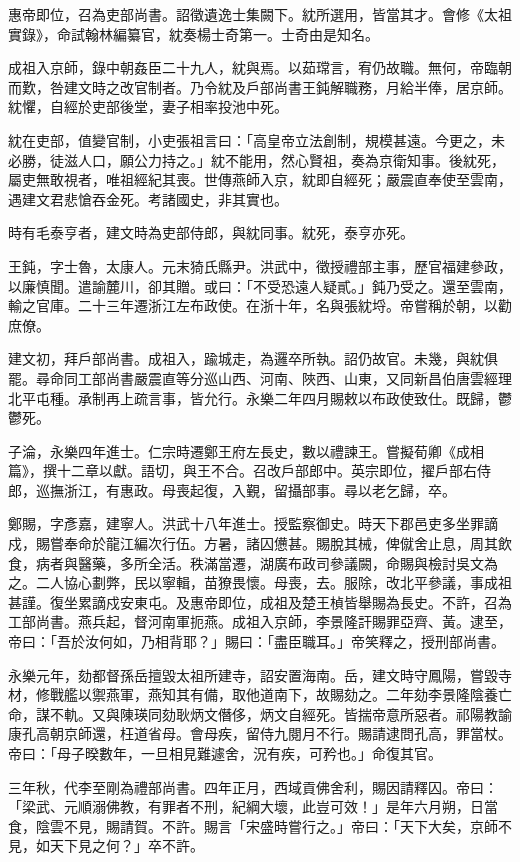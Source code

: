 \begin{pinyinscope}
惠帝即位，召為吏部尚書。詔徵遺逸士集闕下。紞所選用，皆當其才。會修《太祖實錄》，命試翰林編纂官，紞奏楊士奇第一。士奇由是知名。

成祖入京師，錄中朝姦臣二十九人，紞與焉。以茹瑺言，宥仍故職。無何，帝臨朝而歎，咎建文時之改官制者。乃令紞及戶部尚書王鈍解職務，月給半俸，居京師。紞懼，自經於吏部後堂，妻子相率投池中死。

紞在吏部，值變官制，小吏張祖言曰：「高皇帝立法創制，規模甚遠。今更之，未必勝，徒滋人口，願公力持之。」紞不能用，然心賢祖，奏為京衛知事。後紞死，屬吏無敢視者，唯祖經紀其喪。世傳燕師入京，紞即自經死；嚴震直奉使至雲南，遇建文君悲愴吞金死。考諸國史，非其實也。

時有毛泰亨者，建文時為吏部侍郎，與紞同事。紞死，泰亨亦死。

王鈍，字士魯，太康人。元末猗氏縣尹。洪武中，徵授禮部主事，歷官福建參政，以廉慎聞。遣諭麓川，卻其贈。或曰：「不受恐遠人疑貳。」鈍乃受之。還至雲南，輸之官庫。二十三年遷浙江左布政使。在浙十年，名與張紞埒。帝嘗稱於朝，以勸庶僚。

建文初，拜戶部尚書。成祖入，踰城走，為邏卒所執。詔仍故官。未幾，與紞俱罷。尋命同工部尚書嚴震直等分巡山西、河南、陜西、山東，又同新昌伯唐雲經理北平屯種。承制再上疏言事，皆允行。永樂二年四月賜敕以布政使致仕。既歸，鬱鬱死。

子淪，永樂四年進士。仁宗時遷鄭王府左長史，數以禮諫王。嘗擬荀卿《成相篇》，撰十二章以獻。語切，與王不合。召改戶部郎中。英宗即位，擢戶部右侍郎，巡撫浙江，有惠政。母喪起復，入覲，留攝部事。尋以老乞歸，卒。

鄭賜，字彥嘉，建寧人。洪武十八年進士。授監察御史。時天下郡邑吏多坐罪謫戍，賜嘗奉命於龍江編次行伍。方暑，諸囚憊甚。賜脫其械，俾僦舍止息，周其飲食，病者與醫藥，多所全活。秩滿當遷，湖廣布政司參議闕，命賜與檢討吳文為之。二人協心劃弊，民以寧輯，苗獠畏懷。母喪，去。服除，改北平參議，事成祖甚謹。復坐累謫戍安東屯。及惠帝即位，成祖及楚王楨皆舉賜為長史。不許，召為工部尚書。燕兵起，督河南軍扼燕。成祖入京師，李景隆訐賜罪亞齊、黃。逮至，帝曰：「吾於汝何如，乃相背耶？」賜曰：「盡臣職耳。」帝笑釋之，授刑部尚書。

永樂元年，劾都督孫岳擅毀太祖所建寺，詔安置海南。岳，建文時守鳳陽，嘗毀寺材，修戰艦以禦燕軍，燕知其有備，取他道南下，故賜劾之。二年劾李景隆陰養亡命，謀不軌。又與陳瑛同劾耿炳文僭侈，炳文自經死。皆揣帝意所惡者。祁陽教諭康孔高朝京師還，枉道省母。會母疾，留侍九閱月不行。賜請逮問孔高，罪當杖。帝曰：「母子暌數年，一旦相見難遽舍，況有疾，可矜也。」命復其官。

三年秋，代李至剛為禮部尚書。四年正月，西域貢佛舍利，賜因請釋囚。帝曰：「梁武、元順溺佛教，有罪者不刑，紀綱大壞，此豈可效！」是年六月朔，日當食，陰雲不見，賜請賀。不許。賜言「宋盛時嘗行之。」帝曰：「天下大矣，京師不見，如天下見之何？」卒不許。


\end{pinyinscope}
